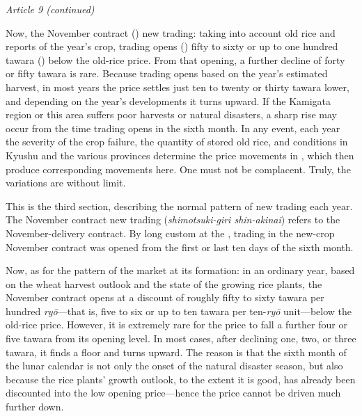 \begin{sokyubox}
{\small\itshape\color{sokyubar} Article 9 (continued)}

\medskip
Now, the November contract () new trading:
taking into account old rice and reports of the year's crop, trading
opens () fifty to sixty or up to one hundred tawara
() below the old-rice price. From that opening, a
further decline of forty or fifty tawara is rare. Because trading opens
based on the year's estimated harvest, in most years the price settles
just ten to twenty or thirty tawara lower, and depending on the year's
developments it turns upward. If the Kamigata region or this area
suffers poor harvests or natural disasters, a sharp rise may occur from
the time trading opens in the sixth month. In any event, each year the
severity of the crop failure, the quantity of stored old rice, and
conditions in Kyushu and the various provinces determine the price
movements in , which then produce corresponding
movements here. One must not be complacent. Truly, the variations are
without limit.
\end{sokyubox}

\commentary
This is the third section, describing the normal pattern of new trading
each year. The November contract new trading (\textit{shimotsuki-giri
shin-akinai}) refers to the November-delivery contract. By long custom
at the , trading in the new-crop
November contract was opened from the first or last ten days of the
sixth month.

Now, as for the pattern of the market at its formation: in an ordinary
year, based on the wheat harvest outlook and the state of the growing
rice plants, the November contract opens at a discount of roughly fifty
to sixty tawara per hundred \textit{ry\=o}---that is, five to six or up
to ten tawara per ten-\textit{ry\=o} unit---below the old-rice price.
However, it is extremely rare for the price to fall a further four or
five tawara from its opening level. In most cases, after declining one,
two, or three tawara, it finds a floor and turns upward. The reason is
that the sixth month of the lunar calendar is not only the onset of the
natural disaster season, but also because the rice plants' growth
outlook, to the extent it is good, has already been discounted into the
low opening price---hence the price cannot be driven much further down.

